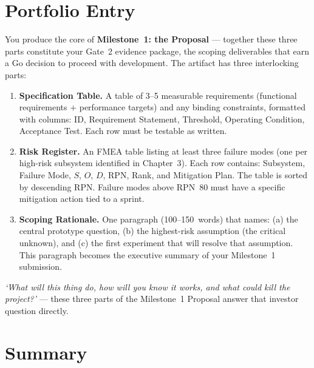 \section*{Portfolio Entry}
\label{sec:ch4-artifact}

You produce the core of \textbf{Milestone~1: the Proposal} --- together these three parts constitute your Gate~2 evidence package, the scoping deliverables that earn a Go decision to proceed with development.
The artifact has three interlocking parts:

\begin{enumerate}
  \item \textbf{Specification Table.}
        A table of 3–5 measurable requirements (functional requirements + performance targets) and any binding constraints, formatted with columns: ID, Requirement Statement, Threshold, Operating Condition, Acceptance Test.
        Each row must be testable as written.

  \item \textbf{Risk Register.}
        An FMEA table listing at least three failure modes (one per high-risk subsystem identified in Chapter~3).
        Each row contains: Subsystem, Failure Mode, $S$, $O$, $D$, RPN, Rank, and Mitigation Plan.
        The table is sorted by descending RPN.
        Failure modes above RPN~80 must have a specific mitigation action tied to a sprint.

  \item \textbf{Scoping Rationale.}
        One paragraph (100–150~words) that names: (a) the central prototype question, (b) the highest-risk assumption (the critical unknown), and (c) the first experiment that will resolve that assumption.
        This paragraph becomes the executive summary of your Milestone~1 submission.
\end{enumerate}

\emph{`What will this thing do, how will you know it works, and what could kill the project?'} --- these three parts of the Milestone~1 Proposal answer that investor question directly.

\section*{Summary}
\label{sec:ch4-summary}

